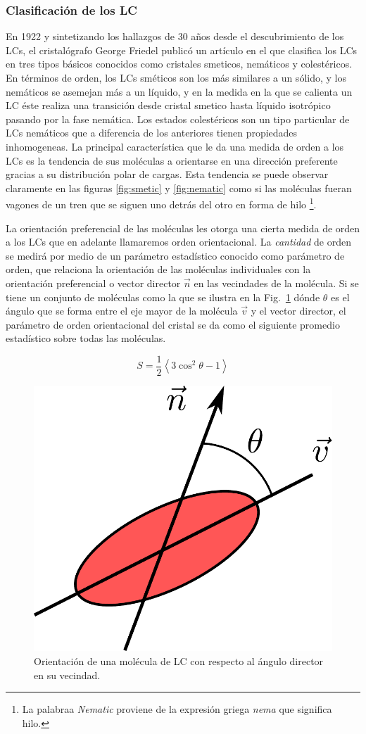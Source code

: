 \subsubsection{Clasificación de los LC}  
\label{sec:LC-clasification}
En 1922 y sintetizando los hallazgos de 30 años desde el descubrimiento
de los LCs, el cristalógrafo George Friedel publicó un artículo 
en el que clasifica los LCs en tres tipos básicos conocidos como
cristales smeticos, nemáticos y colestéricos.
En términos de orden, los LCs sméticos son los más similares a un
sólido, y los nemáticos se asemejan más a un líquido, y en la medida
en la que se calienta un LC éste realiza una transición desde cristal
smetico hasta líquido isotrópico pasando por la fase nemática. Los estados
colestéricos son un tipo particular de LCs nemáticos que a diferencia
de los anteriores tienen propiedades inhomogeneas. 
La principal característica que le da una medida de orden a los LCs es
la tendencia de sus moléculas a orientarse en una dirección
preferente gracias a su distribución polar de cargas. Esta tendencia
se puede observar claramente en las figuras \ref{fig:smetic} y
\ref{fig:nematic} como si las moléculas fueran vagones de un tren que
se siguen uno detrás del otro en forma de hilo \footnote{La palabraa
\textit{Nematic} proviene de la expresión griega \textit{nema} que
significa hilo.}.  

La orientación preferencial de las moléculas les
otorga una cierta medida de orden a los LCs que en adelante llamaremos orden
orientacional. La \textit{cantidad} de orden se medirá por medio de un
parámetro estadístico conocido como parámetro de orden, que relaciona
la orientación de las moléculas individuales con la orientación
preferencial o vector director $\vec{n}$ en las vecindades de
la molécula. Si se tiene un conjunto de moléculas como la que se
ilustra en la Fig.~\ref{fig:angulo_director} dónde 
$\theta$ es el ángulo que se forma entre el eje mayor de la molécula
$\vec{v}$ y el vector director, el parámetro de orden orientacional
del cristal se da como el siguiente promedio estadístico sobre todas
las moléculas.

$$ S = \frac{1}{2}\left<3\cos^2{\theta-1}\right>$$
 
\begin{figure}[h!]
\centering
\includegraphics[width=.3\linewidth]{angulo_director}
\caption{Orientación de una molécula de LC con respecto al ángulo
  director en su vecindad.}
\label{fig:angulo_director}
\end{figure}

